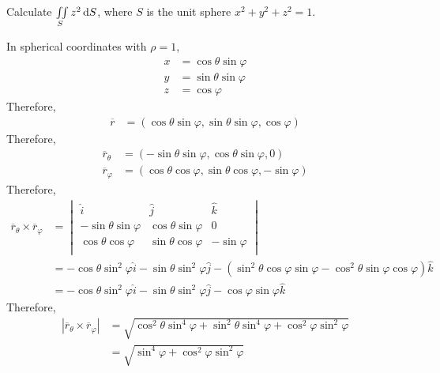 \documentclass[fleqn, a4paper, 12pt, twoside]{article}
\theoremstyle{definition}
\theoremstyle{theorem}
\begin{document}
\begin{question}
	Calculate $\iint\limits_{S} z^2 \dif S$, where $S$ is the unit sphere $x^2 + y^2 + z^2 = 1$.
\end{question}

\begin{solution}
	In spherical coordinates with $\rho = 1$,
	\begin{align*}
		x & = \cos \theta \sin \varphi \\
		y & = \sin \theta \sin \varphi \\
		z & = \cos \varphi
	\end{align*}
	Therefore,
	\begin{align*}
		\overline{r} & = (\cos \theta \sin \varphi , \sin \theta \sin \varphi , \cos \varphi)
	\end{align*}
	Therefore,
	\begin{align*}
		\overline{r}_{\theta}  & = (-\sin \theta \sin \varphi , \cos \theta \sin \varphi , 0) \\
		\overline{r}_{\varphi} & = (\cos \theta \cos \varphi , \sin \theta \cos \varphi , -\sin \varphi)
	\end{align*}
	Therefore,
	\begin{align*}
		\overline{r}_{\theta} \times \overline{r}_{\varphi} &=
			\begin{vmatrix}
				\hat{i}                   & \hat{j}                  & \hat{k}       \\
				-\sin \theta \sin \varphi & \cos \theta \sin \varphi & 0             \\
				\cos \theta \cos \varphi  & \sin \theta \cos \varphi & -\sin \varphi \\
			\end{vmatrix}\\
			&= -\cos \theta \sin^2 \varphi \hat{i} - \sin \theta \sin^2 \varphi \hat{j} - \left( \sin^2 \theta \cos \varphi \sin \varphi - \cos^2 \theta \sin \varphi \cos \varphi \right) \hat{k}\\
			&= -\cos \theta \sin^2 \varphi \hat{i} - \sin \theta \sin^2 \varphi \hat{j} - \cos \varphi \sin \varphi \hat{k}
	\end{align*}
	Therefore,
	\begin{align*}
		\left| \overline{r}_{\theta} \times \overline{r}_{\varphi} \right| & = \sqrt{\cos^2 \theta \sin^4 \varphi + \sin^2 \theta \sin^4 \varphi + \cos^2 \varphi \sin^2 \varphi} \\
                                                                                   & = \sqrt{\sin^4 \varphi + \cos^2 \varphi \sin^2 \varphi}                                              \\

\end{align*}
\end{solution}
\end{document}
